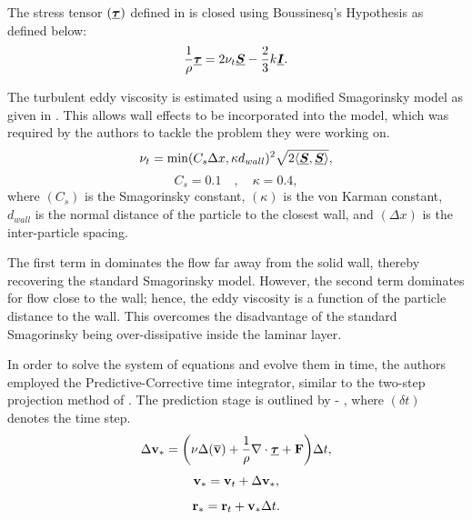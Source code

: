 The stress tensor $(\underline{\bm{\tau}})$ defined in  is closed using Boussinesq’s Hypothesis as defined below:
\begin{equation}
    \frac{1}{\rho} \underline{\bm{\tau}} = 2\nu_t \underline{\bm{S}} - \frac{2}{3}k\underline{\bm{I}}.
    \label{eq:Gotoh2004-boussinesq}
\end{equation}

The turbulent eddy viscosity is estimated using a modified Smagorinsky model as given in . This allows wall effects to be incorporated into the model, which was required by the authors to tackle the problem they were working on.
\begin{equation}
    \nu_t = \min(C_s \Delta x, \kappa d_{wall})^2 \sqrt{2 \langle \underline{\bm{S}}, \underline{\bm{S}} \rangle}
    \label{eq:Gotoh2004-eddy-visc},
\end{equation}
\begin{equation}
    C_s=0.1 \quad , \quad \kappa=0.4,
\end{equation}
where $(C_s)$ is the Smagorinsky constant, $(\kappa)$ is the von Karman constant, $d_{wall}$ is the normal distance of the particle to the closest wall, and $(\Delta x)$ is the inter-particle spacing.

The first term in  dominates the flow far away from the solid wall, thereby recovering the standard Smagorinsky model. However, the second term dominates for flow close to the wall; hence, the eddy viscosity is a function of the particle distance to the wall. This overcomes the disadvantage of the standard Smagorinsky being over-dissipative inside the laminar layer.

In order to solve the system of equations and evolve them in time, the authors employed the Predictive-Corrective time integrator, similar to the two-step projection method of \cite{chorin1968numerical}. The prediction stage is outlined by  - , where $(\delta t)$ denotes the time step.
\begin{equation}
    \Delta \mathbf{v}_* = \bigg( \nu \Delta ( \mathbf{\overline{v}} ) + \frac{1}{\rho}\nabla\cdot\underline{\bm{\tau}} + \mathbf{F} \bigg) \Delta t,
    \label{eq:Gotoh2004-predict-start}
\end{equation}
\begin{equation}
    \mathbf{v}_* = \mathbf{v}_t + \Delta \mathbf{v}_*,
\end{equation}
\begin{equation}
    \mathbf{r}_* = \mathbf{r}_t + \mathbf{v}_* \Delta t.
    \label{eq:Gotoh2004-predict-end}
\end{equation}


